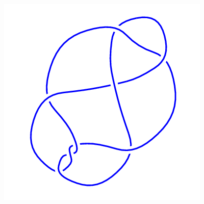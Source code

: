 \begin{figure}[H]
\begin{minipage}[b]{.18\linewidth}
    \end{minipage}
    \begin{minipage}[b]{.18\linewidth}
        \centering
        \includegraphics[width=\linewidth]{../data/8_11.png}
    \end{minipage}
\end{figure}
